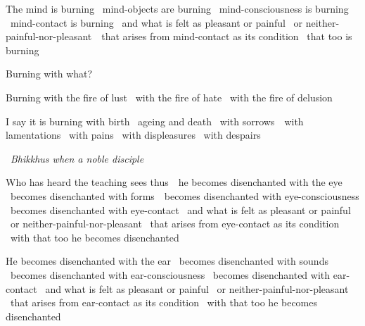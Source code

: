 \begin{english-only-hang}
  The mind is burning \breathmark\ mind-objects are burning \breathmark\ mind-consciousness is burning \breathmark\ mind-contact is burning \breathmark\ and what is felt as pleasant or painful \breathmark\ or neither-painful-nor-{pleasant}~\breathmark\ that arises from mind-contact as its condition \breathmark\ that too is burning
\end{english-only-hang}
\begin{english-only-hang-together}
  Burning with what?
\end{english-only-hang-together}
\begin{english-only-hang-together}
  Burning with the fire of lust \breathmark\ with the fire of hate \breathmark\ with the fire of delusion
\end{english-only-hang-together}
\begin{english-only-hang-together}
  I say it is burning with birth \breathmark\ ageing and death \breathmark\ with \mbox{sorrows}~\breathmark\ with lamentations \breathmark\ with pains \breathmark\ with displeasures \breathmark\ with despairs
\end{english-only-hang-together}

\begin{english-only-leader}
  \anglebracketleft\ \hspace{-0.5mm}\textit{Bhikkhus when a noble disciple} \hspace{-0.5mm}\anglebracketright\
\end{english-only-leader}
\begin{english-only-hang-together}
  Who has heard the teaching sees \mbox{thus}~\breathmark\ he becomes disenchanted with the eye \breathmark\ becomes disenchanted with \mbox{forms}~\breathmark\ becomes disenchanted with eye-consciousness \breathmark\ becomes disenchanted with eye-contact \breathmark\ and what is felt as pleasant or painful \breathmark\ or neither-painful-nor-pleasant \breathmark\ that arises from eye-contact as its condition \breathmark\ with that too he becomes disenchanted
\end{english-only-hang-together}

\begin{english-only-hang}
  He becomes disenchanted with the ear \breathmark\ becomes disenchanted with sounds \breathmark\ becomes disenchanted with ear-consciousness \breathmark\ becomes disenchanted with ear-contact \breathmark\ and what is felt as pleasant or painful \breathmark\ or neither-painful-nor-pleasant \breathmark\ that arises from ear-contact as its condition \breathmark\ with that too he becomes disenchanted
\end{english-only-hang}

